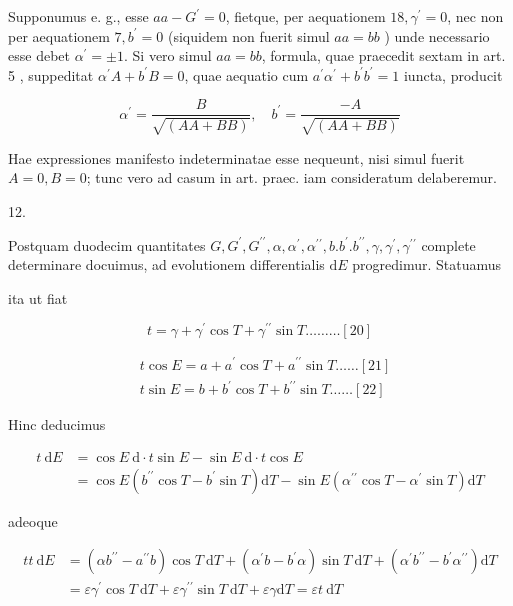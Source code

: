 \documentclass[10pt]{article}
\begin{document}
Supponumus e. g., esse \(a a-G^{\prime}=0\), fietque, per aequationem \(18, \gamma^{\prime}=0\), nec non per aequationem \(7, b^{\prime}=0\) (siquidem non fuerit simul \(a a=b b\) ) unde necessario esse debet \(\alpha^{\prime}= \pm 1\). Si vero simul \(a a=b b\), formula, quae praecedit sextam in art. 5 , suppeditat \(\alpha^{\prime} A+b^{\prime} B=0\), quae aequatio cum \(a^{\prime} \alpha^{\prime}+b^{\prime} b^{\prime}=1\) iuncta, producit

\[
\alpha^{\prime}=\frac{B}{\sqrt{(A A+B B)}}, \quad b^{\prime}=\frac{-A}{\sqrt{(A A+B B)}}
\]

Hae expressiones manifesto indeterminatae esse nequeunt, nisi simul fuerit \(A=0, B=0\); tunc vero ad casum in art. praec. iam consideratum delaberemur.

12.

Postquam duodecim quantitates \(G, G^{\prime}, G^{\prime \prime}, \alpha, \alpha^{\prime}, \alpha^{\prime \prime}, b . b^{\prime} . b^{\prime \prime}, \gamma, \gamma^{\prime}, \gamma^{\prime \prime}\) complete determinare docuimus, ad evolutionem differentialis \(\mathrm{d} E\) progredimur. Statuamus

ita ut fiat

\[
t=\gamma+\gamma^{\prime} \cos T+\gamma^{\prime \prime} \sin T \ldots \ldots \ldots[20]
\]

\[
\begin{aligned}
& t \cos E=a+a^{\prime} \cos T+a^{\prime \prime} \sin T \ldots \ldots[21] \\
& t \sin E=b+b^{\prime} \cos T+b^{\prime \prime} \sin T \ldots \ldots[22]
\end{aligned}
\]

Hinc deducimus

\[
\begin{aligned}
t \mathrm{~d} E & =\cos E \mathrm{~d} \cdot t \sin E-\sin E \mathrm{~d} \cdot t \cos E \\
& =\cos E\left(b^{\prime \prime} \cos T-b^{\prime} \sin T\right) \mathrm{d} T-\sin E\left(\alpha^{\prime \prime} \cos T-\alpha^{\prime} \sin T\right) \mathrm{d} T
\end{aligned}
\]

adeoque

\[
\begin{aligned}
t t \mathrm{~d} E & =\left(\alpha b^{\prime \prime}-a^{\prime \prime} b\right) \cos T \mathrm{~d} T+\left(\alpha^{\prime} b-b^{\prime} \alpha\right) \sin T \mathrm{~d} T+\left(\alpha^{\prime} b^{\prime \prime}-b^{\prime} \alpha^{\prime \prime}\right) \mathrm{d} T \\
& =\varepsilon \gamma^{\prime} \cos T \mathrm{~d} T+\varepsilon \gamma^{\prime \prime} \sin T \mathrm{~d} T+\varepsilon \gamma \mathrm{d} T=\varepsilon t \mathrm{~d} T
\end{aligned}
\]
\end{document}
